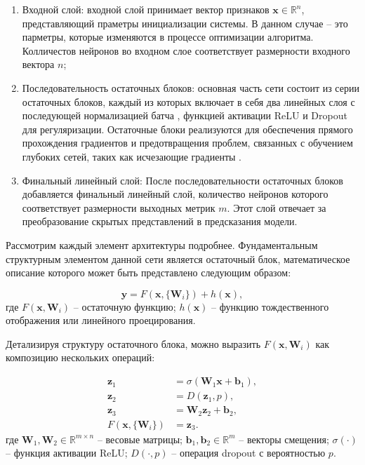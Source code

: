 \begin{enumerate}
    \item Входной слой: входной слой принимает вектор признаков $\mathbf{x} \in \mathbb{R}^n$,
          представляющий праметры инициализации системы. В данном случае -- это парметры,
          которые изменяются в процессе оптимизации алгоритма. Колличестов нейронов во входном
          слое соответствует размерности входного вектора $n$;

    \item Последовательность остаточных блоков: основная часть сети состоит из серии остаточных блоков,
          каждый из которых включает в себя два линейных слоя с последующей нормализацией батча \cite*{ioffe2015batch},
          функцией активации ReLU и Dropout для регуляризации. Остаточные блоки
          реализуются для обеспечения прямого прохождения градиентов и предотвращения
          проблем, связанных с обучением глубоких сетей, таких как исчезающие градиенты \cite*{he2016deep}.

    \item Финальный линейный слой: После последовательности остаточных блоков добавляется финальный линейный слой,
          количество нейронов которого соответствует размерности выходных метрик $m$.
          Этот слой отвечает за преобразование скрытых представлений в предсказания модели.
\end{enumerate}

Рассмотрим каждый элемент архитектуры подробнее.
Фундаментальным структурным элементом данной сети является остаточный блок,
математическое описание которого может быть представлено следующим образом:

\begin{equation}
    \mathbf{y} = F(\mathbf{x}, \{\mathbf{W}_i\}) + h(\mathbf{x}),
\end{equation}
где $F(\mathbf{x}, {\mathbf{W}_i})$ -- остаточную функцию;
$h(\mathbf{x})$ -- функцию тождественного отображения или линейного проецирования.

Детализируя структуру остаточного блока,
можно выразить $F(\mathbf{x}, {\mathbf{W}_i})$ как композицию нескольких операций:

\begin{equation}
    \begin{split}
        \mathbf{z}_1                    & = \sigma(\mathbf{W}_1\mathbf{x} + \mathbf{b}_1), \\
        \mathbf{z}_2                    & = D(\mathbf{z}_1, p),                            \\
        \mathbf{z}_3                    & = \mathbf{W}_2\mathbf{z}_2 + \mathbf{b}_2,       \\
        F(\mathbf{x}, \{\mathbf{W}_i\}) & = \mathbf{z}_3.
    \end{split}
\end{equation}
где $\mathbf{W}_1, \mathbf{W}_2 \in \mathbb{R}^{m \times n}$ -- весовые матрицы;
$\mathbf{b}_1, \mathbf{b}_2 \in \mathbb{R}^m$ -- векторы смещения;
$\sigma(\cdot)$ -- функция активации ReLU;
$D(\cdot, p)$ -- операция dropout с вероятностью $p$.

